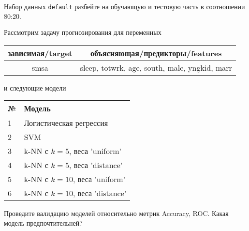 \begin{exercise}
Набор данных \texttt{default} разбейте на обучающую и тестовую часть
в соотношении 80:20.
	
Рассмотрим задачу прогнозирования для переменных
\begin{center}
	\begin{tabular}{|c|c|}\hline
		зависимая/target & объясняющая/предикторы/features \\ \hline
		smsa & sleep, totwrk, age, south, male, yngkid, marr \\ \hline
	\end{tabular}
\end{center}
и следующие модели
\begin{center}
	\begin{tabular}{|l|l|}\hline
		№ & Модель \\ \hline
		1 & Логистическая регрессия\\
		2 & SVM \\ 
		3 & k-NN с \(k=5\), веса 'uniform' \\
		4 & k-NN с \(k=5\), веса 'distance' \\
		5 & k-NN с \(k=10\), веса 'uniform' \\
		6 & k-NN с \(k=10\), веса 'distance' \\ \hline
	\end{tabular}
\end{center}
Проведите валидацию моделей относительно метрик Accuracy, ROC. Какая модель предпочтительней?
\end{exercise}